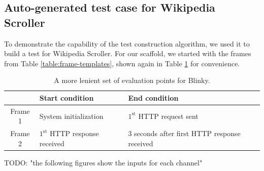 \documentclass[12pt]{article}
\begin{document}
\subsection{Auto-generated test case for Wikipedia Scroller}
To demonstrate the capability of the test construction algorithm, we used it to build a test for Wikipedia Scroller.  For our scaffold, we started with the frames from Table \ref{table:frame-templates}, shown again in Table \ref{table:frame-templates-2} for convenience.

\begin{table}[ht]
\begin{center}
\vspace{2mm}
\begin{tabular}{c|ll}
& Start condition & End condition \\ \hline
Frame 1 & System initialization & $1^{\text{st}}$ HTTP request sent \\
Frame 2 & $1^{\text{st}}$ HTTP response received & 3 seconds after first HTTP response received \\ \hline
\end{tabular}
\caption{A more lenient set of evaluation points for Blinky.}
\label{table:frame-templates-2}
\end{center}
\end{table}

TODO: "the following figures show the inputs for each channel"
\end{document}
